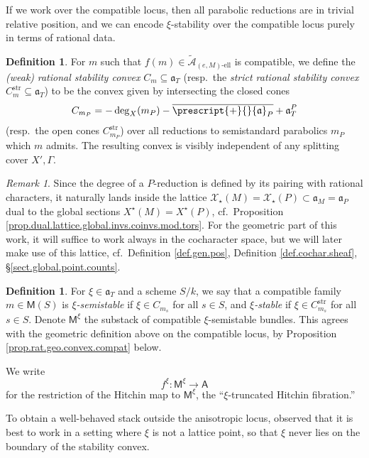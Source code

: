 \documentclass[openany]{amsbook}
\theoremstyle{definition}
\newtheorem{definition}[theorem]{Definition}
\theoremstyle{remark}
\newtheorem{remark}[theorem]{Remark}
\numberwithin{equation}{section}
\newcommand{\cA}{\mathcal{A}}
\newcommand{\cX}{\mathcal{X}}
\newcommand{\ol}[1]{\overline{#1}}
\renewcommand{\-}{\operatorname{-}}
\renewcommand{\a}{\mathfrak{a}}
\newcommand{\str}{\mathrm{str}}
\newcommand{\el}{\text{-ell}}
\newcommand{\ctA}{\widetilde{\cA}}
\newcommand{\ctAe}[2]{\ctA_{(#1, #2)\el}}
\newcommand{\bM}{\mathsf{M}}
\newcommand{\bA}{\mathsf{A}}
\newcommand{\obtcone}{\prescript{+}{}{\a}}
\begin{document}
If we work over the compatible locus, then all parabolic reductions are in trivial relative position, and we can encode $\xi$-stability over the compatible locus purely in terms of rational data.
\begin{definition}\label{def.rel.stab.convex}
    For $m$ such that $f(m) \in \ctAe{e}{M}$ is compatible, we define the \textit{(weak)} \textit{rational stability convex} $C_m \subseteq \a_T$ (resp.\ the \textit{strict rational stability convex} $C_m^{\str} \subseteq \a_T$) to be the convex given by intersecting the closed cones
    $$
        C_{m_P} = -\deg_X(m_P) - \ol{\obtcone_P} + \a_T^P
    $$
    (resp.\ the open cones $C_{m_P}^{\str}$) over all reductions to semistandard parabolics $m_P$ which $m$ admits. The resulting convex is visibly independent of any splitting cover $X', \Gamma$.
\end{definition}

\begin{remark}
    Since the degree of a $P$-reduction is defined by its pairing with rational characters, it naturally lands inside the lattice $\cX_\star(M) = \cX_\star(P) \subset \a_M = \a_P$ dual to the global sections $X^\star(M) = X^\star(P)$, cf.\ Proposition \ref{prop.dual.lattice.global.invs.coinvs.mod.tors}. For the geometric part of this work, it will suffice to work always in the cocharacter space, but we will later make use of this lattice, cf.\ Definition \ref{def.gen.pos}, Definition \ref{def.cochar.sheaf}, \S \ref{sect.global.point.counts}.
\end{remark}


\begin{definition}
For $\xi \in \a_T$ and a scheme $S/k$, we say that a compatible family $m \in \bM(S)$ is \emph{$\xi$-semistable} if $\xi \in C_{m_s}$ for all $s \in S$, and \emph{$\xi$-stable} if $\xi \in C_{m_s}^{\str}$ for all $s \in S$. Denote $\bM^\xi$ the substack of compatible $\xi$-semistable bundles. This agrees with the geometric definition above on the compatible locus, by Proposition \ref{prop.rat.geo.convex.compat} below.


    We write
    $$
        f^\xi : \bM^\xi \to \bA
    $$
    for the restriction of the Hitchin map to $\bM^\xi$, the ``$\xi$-truncated Hitchin fibration.''
\end{definition}


To obtain a well-behaved stack outside the anisotropic locus, \cite{CLI} observed that it is best to work in a setting where $\xi$ is not a lattice point, so that $\xi$ never lies on the boundary of the stability convex.
\end{document}
